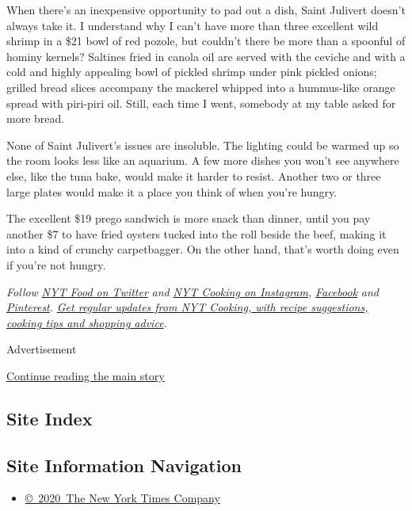 When there's an inexpensive opportunity to pad out a dish, Saint
Julivert doesn't always take it. I understand why I can't have more than
three excellent wild shrimp in a \$21 bowl of red pozole, but couldn't
there be more than a spoonful of hominy kernels? Saltines fried in
canola oil are served with the ceviche and with a cold and highly
appealing bowl of pickled shrimp under pink pickled onions; grilled
bread slices accompany the mackerel whipped into a hummus-like orange
spread with piri-piri oil. Still, each time I went, somebody at my table
asked for more bread.

None of Saint Julivert's issues are insoluble. The lighting could be
warmed up so the room looks less like an aquarium. A few more dishes you
won't see anywhere else, like the tuna bake, would make it harder to
resist. Another two or three large plates would make it a place you
think of when you're hungry.

The excellent \$19 prego sandwich is more snack than dinner, until you
pay another \$7 to have fried oysters tucked into the roll beside the
beef, making it into a kind of crunchy carpetbagger. On the other hand,
that's worth doing even if you're not hungry.

\emph{Follow} \emph{\href{https://twitter.com/nytfood}{NYT Food on
Twitter}} \emph{and}
\emph{\href{https://www.instagram.com/nytcooking/}{NYT Cooking on
Instagram},}
\emph{\href{https://www.facebookcorewwwi.onion/nytcooking/}{Facebook}}
\emph{and}
\emph{\href{https://www.pinterest.com/nytcooking/}{Pinterest}.}
\emph{\href{https://www.nytimes3xbfgragh.onion/newsletters/cooking}{Get
regular updates from NYT Cooking, with recipe suggestions, cooking tips
and shopping advice}.}

Advertisement

\protect\hyperlink{after-bottom}{Continue reading the main story}

\hypertarget{site-index}{%
\subsection{Site Index}\label{site-index}}

\hypertarget{site-information-navigation}{%
\subsection{Site Information
Navigation}\label{site-information-navigation}}

\begin{itemize}
\tightlist
\item
  \href{https://help.nytimes3xbfgragh.onion/hc/en-us/articles/115014792127-Copyright-notice}{©~2020~The
  New York Times Company}
\end{itemize}

